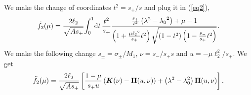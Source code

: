 We make the change of coordinates $t^2=s_+/s$ and plug it in (\ref{eq2}),
\begin{equation}\label{eq22}
    \Tilde{f}_2(\mu) = \frac{2\ell_2}{\sqrt{As_+}} {\int_{0}}^1 \text{d}t\,\frac{t^2}{s_+} \frac{\frac{s_+}{t^2}\left(\lambda^2-{\lambda_0}^2\right)+\mu-1}{\left(1+\frac{\mu{\ell_2}^2}{s_+}t^2\right)\sqrt{\left(1-t^2\right)\left(1-\frac{s_-}{s_+}t^2\right)}}.
\end{equation}
We make the following change $s_\pm=\sigma_\pm/M_1$, $\nu=s_-/s_+s$ and $u=-\mu\ell_2^2/s_+$. We get
\begin{equation}
    \Tilde{f}_2(\mu) = \frac{2\ell_2}{\sqrt{As_+}}\left[\frac{1-\mu}{s_+ u}\left(\bm{K}(\nu)-\bm{\Pi}(u,\nu)\right)+\left(\lambda^2-\lambda_0^2\right)\bm{\Pi}(u,\nu)\right].
\end{equation}